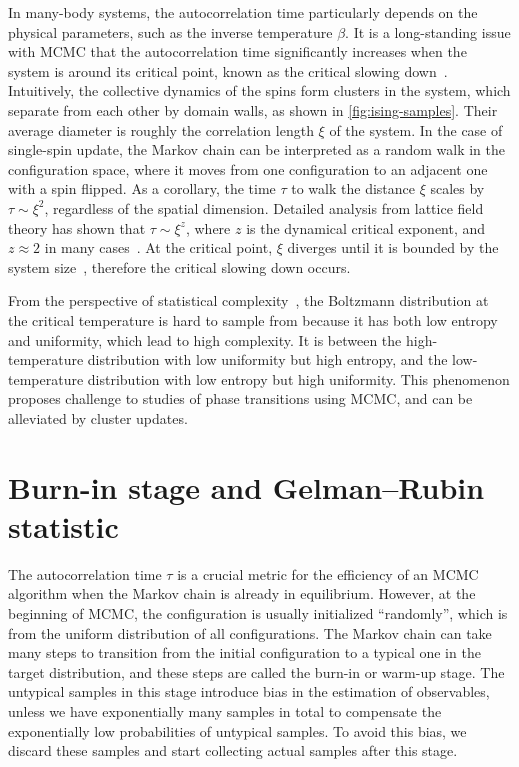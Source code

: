 In many-body systems, the autocorrelation time particularly depends on the physical parameters, such as the inverse temperature $\beta$. It is a long-standing issue with MCMC that the autocorrelation time significantly increases when the system is around its critical point, known as the critical slowing down~\cite{goodman1989multigrid, wolff1990critical}. Intuitively, the collective dynamics of the spins form clusters in the system, which separate from each other by domain walls, as shown in \cref{fig:ising-samples}. Their average diameter is roughly the correlation length $\xi$ of the system. In the case of single-spin update, the Markov chain can be interpreted as a random walk in the configuration space, where it moves from one configuration to an adjacent one with a spin flipped. As a corollary, the time $\tau$ to walk the distance $\xi$ scales by $\tau \sim \xi^2$, regardless of the spatial dimension. Detailed analysis from lattice field theory has shown that $\tau \sim \xi^z$, where $z$ is the dynamical critical exponent, and $z \approx 2$ in many cases~\cite{hohenberg1977theory}. At the critical point, $\xi$ diverges until it is bounded by the system size~\cite{lubetzky2012critical}, therefore the critical slowing down occurs.

From the perspective of statistical complexity~\cite{lopez1995statistical}, the Boltzmann distribution at the critical temperature is hard to sample from because it has both low entropy and uniformity, which lead to high complexity. It is between the high-temperature distribution with low uniformity but high entropy, and the low-temperature distribution with low entropy but high uniformity. This phenomenon proposes challenge to studies of phase transitions using MCMC, and can be alleviated by cluster updates.

\section{Burn-in stage and Gelman--Rubin statistic}

The autocorrelation time $\tau$ is a crucial metric for the efficiency of an MCMC algorithm when the Markov chain is already in equilibrium. However, at the beginning of MCMC, the configuration is usually initialized ``randomly'', which is from the uniform distribution of all configurations. The Markov chain can take many steps to transition from the initial configuration to a typical one in the target distribution, and these steps are called the burn-in or warm-up stage. The untypical samples in this stage introduce bias in the estimation of observables, unless we have exponentially many samples in total to compensate the exponentially low probabilities of untypical samples. To avoid this bias, we discard these samples and start collecting actual samples after this stage.

